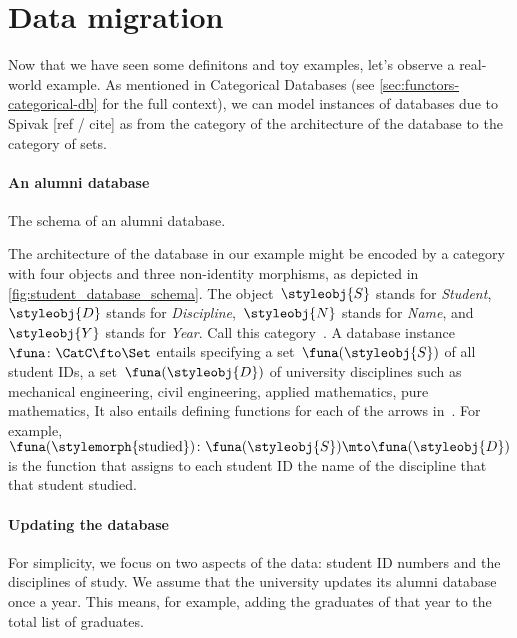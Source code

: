 \clearpage
\section{Data migration}
Now that we have seen some definitons and toy examples, let's observe a real-world example.
As mentioned in Categorical Databases (see \ref{sec:functors-categorical-db} for the full context),
we can model instances of databases due to Spivak [ref / cite] as  from the category of the architecture of the database to the category of sets.

\paragraph{An alumni database}

%
\begin{marginfigure}
    \centering
    \caption{The schema of an alumni database.}
    \label{fig:student_database_schema}
\end{marginfigure}
%

The architecture of the database in our example might be encoded by a category with four objects and three non-identity morphisms, as depicted in \cref{fig:student_database_schema}.
The object~$\styleobj{S}$ stands for \emph{Student},~$\styleobj{D}$ stands for \emph{Discipline},~$\styleobj{N}$ stands for \emph{Name}, and~$\styleobj{Y}$ stands for \emph{Year}.
Call this category~\CatC.
A database instance~$\funa \colon \CatC \fto \Set$ entails specifying a set~$\funa(\styleobj{S})$ of all student IDs, a set~$\funa(\styleobj{D})$ of university disciplines such as mechanical engineering, civil engineering, applied mathematics, pure mathematics, \etc
It also entails defining functions for each of the arrows in~\CatC.
For example,~$\funa(\stylemorph{\text{studied}}) \colon \funa(\styleobj{S}) \mto \funa(\styleobj{D})$ is the function that assigns to each student ID the name of the discipline that that student studied.

\paragraph{Updating the database}

For simplicity, we focus on two aspects of the data: student ID numbers and the disciplines of study.
We assume that the university updates its alumni database once a year.
This means, for example, adding the graduates of that year to the total list of graduates.


